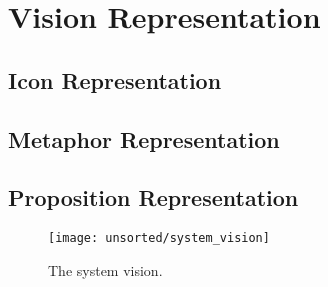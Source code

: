 \section{Vision Representation}
\subsection{Icon Representation}
\subsection{Metaphor Representation}
\subsection{Proposition Representation}
\begin{figure}[!htbp]
    \centering
    \texttt{[image: unsorted/system\_vision]}
    \caption{The system vision.}
    \label{fig:system_vision}
\end{figure}
\FloatBarrier